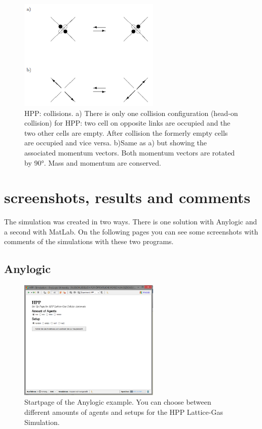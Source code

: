 \documentclass[paper=a4, fontsize=11pt]{scrartcl} %
\numberwithin{equation}{section} %
\numberwithin{figure}{section} %
\numberwithin{table}{section} %
\begin{document}
\begin{figure}[H]
	\centering
		\includegraphics[width=0.60\textwidth]{Screenshots/ImplementationRules-2.PNG}
	\caption[HPP collisions]{HPP: collisions. 
a) There is only one collision configuration (head-on collision) for HPP: two cell on opposite links are occupied and the two other cells are empty. After collision the formerly empty cells are occupied and vice versa. 
b)Same as a) but showing the associated momentum vectors. Both momentum vectors are rotated by 90°. Mass and momentum are conserved. \cite{LGCA} }
	\label{fig:collisions}
\end{figure}

\pagebreak
\section{screenshots, results and comments}
The simulation was created in two ways. There is one solution with Anylogic and a second with MatLab. On the following pages you can see some screenshots with comments of the simulations with these two programs.

\subsection{Anylogic}

\begin{figure}[H]
	\centering
		\includegraphics[width=0.60\textwidth]{Screenshots/Anylogic-Start.PNG}
	\caption[Anylogic Startpage]{Startpage of the Anylogic example. You can choose between different amounts of agents and setups for the HPP Lattice-Gas Simulation.}
	\label{fig:anylogic-start}
\end{figure}
\end{document}
